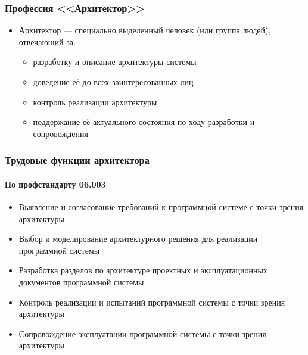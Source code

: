 \documentclass{../../slides-style}
\begin{document}
    \begin{frame}
        \frametitle{Профессия <<Архитектор>>}
        \begin{itemize}
            \item Архитектор --- специально выделенный человек (или группа людей), отвечающий за:
            \begin{itemize}
                \item разработку и описание архитектуры системы
                \item доведение её до всех заинтересованных лиц
                \item контроль реализации архитектуры
                \item поддержание её актуального состояния по ходу разработки и сопровождения
            \end{itemize}
        \end{itemize}
    \end{frame}

    \begin{frame}
        \frametitle{Трудовые функции архитектора}
        \framesubtitle{По профстандарту 06.003}
        \begin{itemize}
            \item Выявление и согласование требований к программной системе с точки зрения архитектуры
            \item Выбор и моделирование архитектурного решения для реализации программной системы
            \item Разработка разделов по архитектуре проектных и эксплуатационных документов программной системы
            \item Контроль реализации и испытаний программной системы с точки зрения архитектуры
            \item Сопровождение эксплуатации программной системы с точки зрения архитектуры
        \end{itemize}
    \end{frame}
\end{document}

